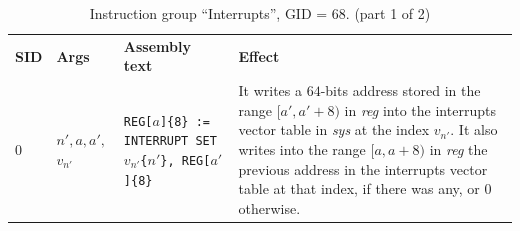 \documentclass[10pt,twocolumn]{article}
\begin{document}


\begin{table}[!h]
\begin{center}
\def\arraystretch{1.5}
\begin{tabular}{lp{1.2cm}p{5.5cm}p{7.5cm}}
\textbf{SID} & \textbf{Args} & \textbf{Assembly text} & \textbf{Effect}
\\

0 & $ n',a,a',$  $v_{n'} $ %
& \texttt{REG[}$ a $\texttt{]\{8\} := INTERRUPT SET }$ v_{n'} $\texttt{\{}$ n'
$\texttt{\}, REG[}$ a' $\texttt{]\{8\}} %
& It writes a $ 64 $-bits address stored in the range $ [a',a'+8) $ in
\textit{reg} into the interrupts vector table in \textit{sys} at the index $
v_{n'} $. It also writes into the range $ [a,a+8) $ in \textit{reg} the
previous address in the interrupts vector table at that index, if there was any,
or 0 otherwise. \\

\end{tabular}
\end{center}
\caption{Instruction group ``Interrupts'', GID = 68. (part 1 of 2)}
\label{tab:igroup:interrupts}
\end{table}

\clearpage
\end{document}
